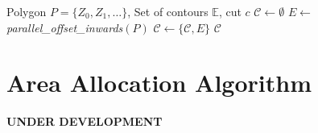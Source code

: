 \documentclass[../main.tex]{subfiles}
\begin{document}
%		








\begin{algorithm}
	\small
	\caption{$\operatorname{recalc\_encirclements}$}
	\label{alg:update_contours}
	\begin{algorithmic}[1]
		\REQUIRE Polygon $P=\{Z_0,Z_1,\ldots\}$, Set of contours $\mathbb{E}$, cut $c$
		\STATE $\mathcal{C}\gets\emptyset$ 
		\REPEAT
			\STATE $E\gets$ \textit{parallel\_offset\_inwards}$(P)$
			\STATE $\mathcal{C}\gets\{\mathcal{C},E\}$
		\RETURN $\mathcal{C}$
	\end{algorithmic}
\end{algorithm}


\section{Area Allocation Algorithm}
\label{sec:area_allocation_algo}
\textbf{UNDER DEVELOPMENT}
\end{document}
